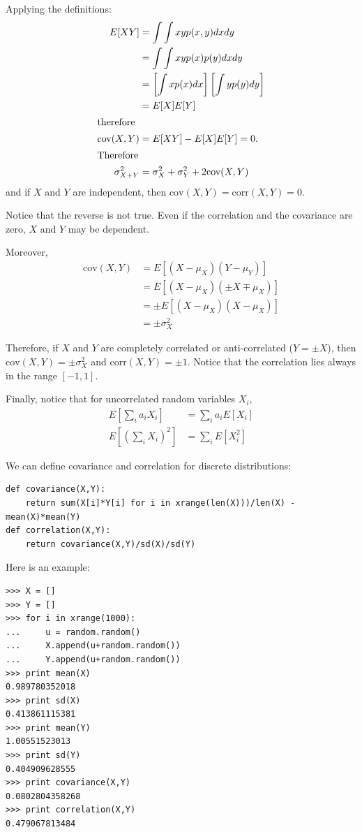 \documentclass[justified,sixbynine]{tufte-book}
\def\ft{\small\tt}
\theoremstyle{plain}%
\theoremstyle{definition}
\theoremstyle{remark}
\begin{document}
\begin{fullwidth}
Applying the definitions:
\begin{align}
E[XY] &=\int \int xyp(x,y)dxdy \\
&=\int \int xyp(x)p(y)dxdy \\
&=\left[ \int xp(x)dx\right] \left[ \int yp(y)dy\right] \\
&=E[X]E[Y] \\
\intertext{therefore}
\textrm{cov}(X,Y) &=E[XY]-E[X]E[Y]=0. \\
\intertext{Therefore}
\sigma _{X+Y}^2&=\sigma _X^2+\sigma _Y^2+2 \textrm{cov}(X,Y)
\end{align}
and if $X$ and $Y$ are independent, then $\textrm{cov}(X,Y)=\textrm{corr}(X,Y)=0$.

Notice that the reverse is not true. Even if the correlation and the covariance are zero, $X$ and $Y$ may be dependent.

Moreover,
\begin{align}
\textrm{cov}(X,Y) &=E[(X-\mu _X)(Y-\mu _Y)] \\
&=E[(X-\mu _X)(\pm X\mp \mu _X)] \\
&=\pm E[(X-\mu _X)(X-\mu _X)] \\
&=\pm \sigma _X^2
\end{align}

Therefore, if $X$ and $Y$ are completely correlated or anti-correlated ($Y=\pm X$), then $\textrm{cov}(X,Y)=\pm \sigma _X^2$ and $\textrm{corr}(X,Y) = \pm 1$.
Notice that the correlation lies always in the range $[-1,1]$.

Finally, notice that for uncorrelated random variables $X_i$,
\begin{align}
E[\sum_ia_iX_i] &=\sum_ia_iE[X_i] \\
E[(\sum_iX_i)^2] &=\sum_iE[X_i^2]
\end{align}


We can define covariance and correlation for discrete distributions:
\begin{lstlisting}[caption={in file: {\ft nlib.py}}]
def covariance(X,Y):
    return sum(X[i]*Y[i] for i in xrange(len(X)))/len(X) - mean(X)*mean(Y)
def correlation(X,Y):
    return covariance(X,Y)/sd(X)/sd(Y)
\end{lstlisting}

Here is an example:
\begin{lstlisting}[caption={in file: {\ft nlib.py}}]
>>> X = []
>>> Y = []
>>> for i in xrange(1000):
...     u = random.random()
...     X.append(u+random.random())
...     Y.append(u+random.random())
>>> print mean(X)
0.989780352018
>>> print sd(X)
0.413861115381
>>> print mean(Y)
1.00551523013
>>> print sd(Y)
0.404909628555
>>> print covariance(X,Y)
0.0802804358268
>>> print correlation(X,Y)
0.479067813484
\end{lstlisting}


\end{fullwidth}
\end{document}
